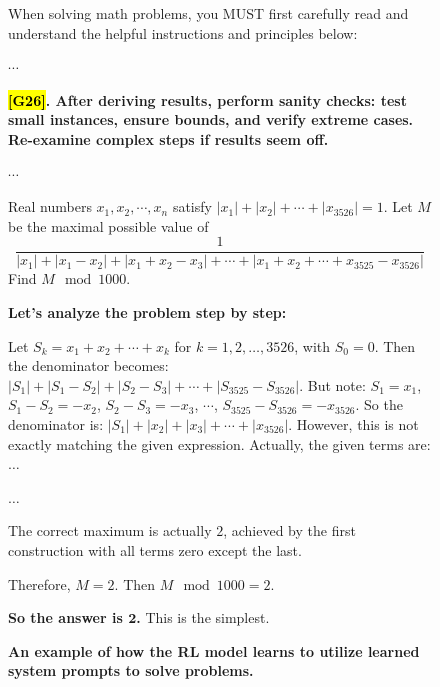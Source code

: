 \documentclass{article}
\theoremstyle{plain}
\theoremstyle{definition}
\theoremstyle{remark}
\begin{document}
\begin{figure}[!tb]
\centering
\caption{\textbf{An example of how the RL model learns to utilize learned system prompts to solve problems.}}

\begin{runcard}[title={Example of How E-SPL Shapes Model Behavior}]

\medskip

\begin{runbox}[title={\textbf{Learned System Prompt}}]
When solving math problems, you MUST first carefully read and understand the helpful instructions and principles below:

$\cdots$

\textbf{\color{Brown}\hl{{[G26]}}. After deriving results, perform sanity checks: test small instances, ensure bounds, and verify extreme cases. Re-examine complex steps if results seem off.}

$\cdots$
\end{runbox}

\begin{runbox}[title={Problem}]
Real numbers \(x_1,x_2,\cdots,x_n\) satisfy
\(|x_1|+|x_2|+\cdots+|x_{3526}| = 1\). Let \(M\) be the maximal possible value of 
\[
\frac{1}{|x_1|+|x_1 - x_2|+|x_1 + x_2 - x_3|+\cdots+|x_1 + x_2+\cdots+x_{3525}-x_{3526}|}
\]
Find \(M\mod 1000\).

\end{runbox}

\begin{runbox}[title={Model Output}]

\textbf{Let's analyze the problem step by step:}

Let \(S_k = x_1 + x_2 + \cdots + x_k\) for \(k=1,2,\dots,3526\), with \(S_0 = 0\). Then the denominator becomes:
$
|S_1| + |S_1 - S_2| + |S_2 - S_3| + \cdots + |S_{3525} - S_{3526}|.
$
But note: \(S_1 = x_1\), \(S_1 - S_2 = -x_2\), \(S_2 - S_3 = -x_3\), $\cdots$, \(S_{3525} - S_{3526} = -x_{3526}\). So the denominator is:
$
|S_1| + |x_2| + |x_3| + \cdots + |x_{3526}|.
$
However, this is not exactly matching the given expression. Actually, the given terms are:\quad $\dots$

$\dots$

The correct maximum is actually $2$, achieved by the first construction with all terms zero except the last.

Therefore, $M = 2$. Then $M \mod 1000 = 2$.

\textbf{So the answer is $\boldsymbol{2}$.} This is the simplest.


\end{runbox}
\end{runcard}
\end{figure}
\end{document}
